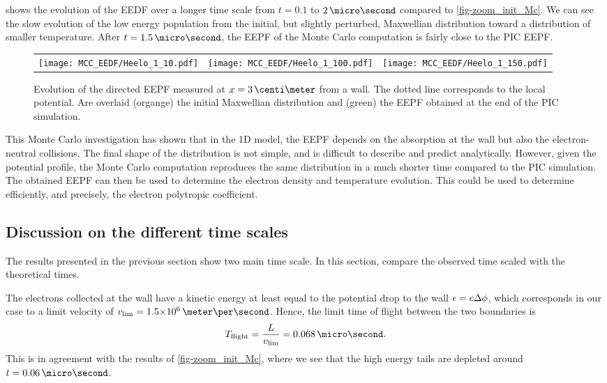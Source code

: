      shows the evolution of the EEDF over a longer time scale from $t=0.1$ to $2\,\micro\second$ compared to \cref{fig-zoom_init_Mc}.
    We can see the slow evolution of the low energy population from the initial, but slightly perturbed, Maxwellian distribution toward a distribution of smaller temperature.
    After $t=1.5\,\micro\second$, the EEPF of the Monte Carlo computation is fairly close to the \ac{PIC} EEPF.

    \begin{figure}[!hbt]
      \begin{tabular}{@{} ccc}
        \texttt{[image: MCC\_EEDF/Heelo\_1\_10.pdf]} &
        \texttt{[image: MCC\_EEDF/Heelo\_1\_100.pdf]} &
        \texttt{[image: MCC\_EEDF/Heelo\_1\_150.pdf]} \\
      \end{tabular}
      \caption{Evolution of the directed EEPF measured at $x=3\,\centi\meter$ from a wall. The dotted line corresponds to the local potential. Are overlaid (organge) the initial Maxwellian distribution and (green) the EEPF obtained at the end of the \acs{PIC} simulation. }
      \label{fig-zoom_Mc_later}
    \end{figure}

    \vspace{1em}
    This Monte Carlo investigation has shown that in the \ac{1D} model, the EEPF depends on the absorption at the wall but also the electron-neutral collisions.
    The final shape of the distribution is not simple, and is difficult to describe and predict analytically.
    However, given the potential profile, the Monte Carlo computation reproduces the same distribution in a much shorter time compared to the \ac{PIC} simulation. 
    The obtained EEPF can then be used to determine the electron density and temperature evolution.
    This could be used to determine efficiently, and precisely, the electron polytropic coefficient.

  \subsection{Discussion on the different time scales}
    The results presented in the previous section show two main time scale.
    In this section, compare the observed time scaled with the theoretical times.
    
    The electrons collected at the wall have a kinetic energy at least equal to the potential drop to the wall $\epsilon = e \Delta \phi$, which corresponds in our case to a limit velocity of $v_{\rm lim} = \sn{1.5}{6} \,\meter\per\second$.
    Hence, the limit time of flight between the two boundaries is
    \[ T_{\rm flight} = \frac{L}{v_{\rm lim}} = 0.068 \,\micro\second.  \]
    This is in agreement with the results of \cref{fig-zoom_init_Mc}, where we see that the high energy tails are depleted around $t=0.06\,\micro\second$.
    

